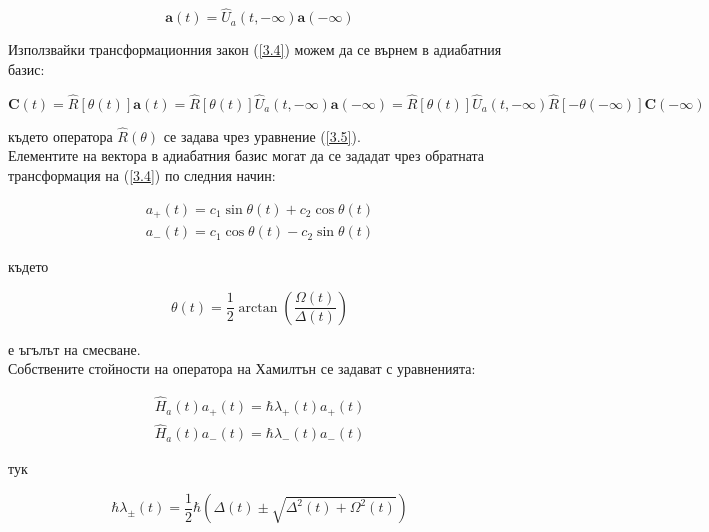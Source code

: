     \begin{equation}
        \mathbf{a}(t)=\hat{U}_a(t,-\infty)\mathbf{a}(-\infty)
    \end{equation}

    Използвайки трансформационния закон (\ref{3.4}) можем да се върнем в адиабатния базис:

    \begin{equation}
        \mathbf{C}(t) = \hat{R}\left[\theta(t)\right]\mathbf{a}(t) = \hat{R}\left[\theta(t)\right] \hat{U}_a(t,-\infty)\mathbf{a}(-\infty)
        = \hat{R}\left[\theta(t)\right] \hat{U}_a(t,-\infty)\hat{R}\left[-\theta(-\infty)\right]\mathbf{C}(-\infty)
    \end{equation}

    където оператора $\hat{R}\left(\theta\right)$ се задава чрез уравнение (\ref{3.5}). \\
    Елементите на вектора в адиабатния базис могат да се зададат чрез обратната трансформация на (\ref{3.4}) по следния начин:

    \begin{subequations}
        \begin{align}
            a _+(t) = c_1 \sin\theta (t) + c_2 \cos\theta (t)\\
            a_-(t) = c_1 \cos\theta (t) - c_2 \sin\theta (t)
        \end{align}
    \end{subequations}

    където

    \begin{equation}
        \theta (t) = \frac{1}{2} \arctan\left(\frac{\Omega (t)}{\Delta (t)} \right)
    \end{equation}

    е ъгълът на смесване.\\
    Собствените стойности на оператора на Хамилтън се задават с уравненията:

    \begin{subequations}
        \begin{align}
            \hat{H}_a(t)a_+(t) = \hbar\lambda_+(t)a_+(t)\\
            \hat{H}_a(t)a_-(t) = \hbar\lambda_-(t)a_-(t)
        \end{align}
    \end{subequations}

    тук

    \begin{equation}
        \hbar\lambda_\pm(t) = \frac{1}{2}\hbar\left(\Delta (t)\pm \sqrt{\Delta^2(t)+\Omega^2(t)}\right)
    \end{equation}


